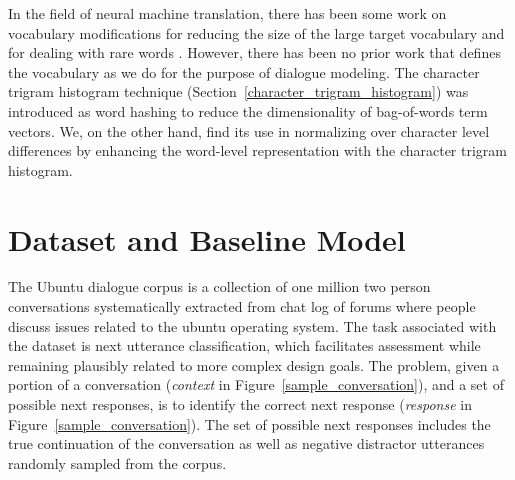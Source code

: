 \documentclass[11pt]{report}
\renewcommand\cite{\citep}	%
\begin{document}
In the field of neural machine translation, there has been some work on vocabulary modifications for reducing the size of the large target vocabulary \cite{JeanCMB15, mi2016vocabulary} and for dealing with rare words \cite{luong2014addressing, sennrich2015neural}. 
However, there has been no prior work that defines the vocabulary as we do for the purpose of dialogue modeling.
The character trigram histogram technique (Section~\ref{character_trigram_histogram}) was introduced as word hashing \cite{huang2013learning} to reduce the dimensionality of bag-of-words term vectors. We, on the other hand, find its use in normalizing over character level differences by enhancing the word-level representation with the character trigram histogram. 

\section{Dataset and Baseline Model}\label{dataset_baseline}

The Ubuntu dialogue corpus is a collection of one million two person conversations systematically extracted from chat log of forums where people discuss issues related to the ubuntu operating system. The task associated with the dataset is next utterance classification, which facilitates assessment while remaining plausibly related to more
complex design goals.  The problem, given a portion of a conversation (\textit{context} in Figure~\ref{sample_conversation}), and a set of possible next responses, is to identify the correct next response (\textit{response} in Figure~\ref{sample_conversation}).  The set of possible next responses includes the true continuation of the conversation as well as negative distractor utterances randomly sampled from the corpus.
\end{document}
